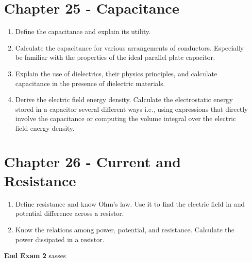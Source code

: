 \documentclass[12pt]{article}
\begin{document}
\section*{Chapter 25 - Capacitance}
\begin{enumerate}
    \item Define the capacitance and explain its utility.
    \item Calculate the capacitance for various arrangements of conductors. Especially be familiar with the properties of the ideal parallel plate capacitor.
    \item Explain the use of dielectrics, their physics principles, and calculate capacitance in the presence of dielectric materials.
    \item Derive the electric field energy density. Calculate the electrostatic energy stored in a capacitor several different ways i.e., using expressions that directly involve the capacitance or computing the volume integral over the electric field energy density.
\end{enumerate}
\section*{Chapter 26 - Current and Resistance}
\begin{enumerate}
    \item Define resistance and know Ohm's law. Use it to find the electric field in and potential difference across a resistor.
    \item Know the relations among power, potential, and resistance. Calculate the power dissipated in a resistor.
\end{enumerate}
\textbf{End Exam 2}
sasses  
\end{document}
